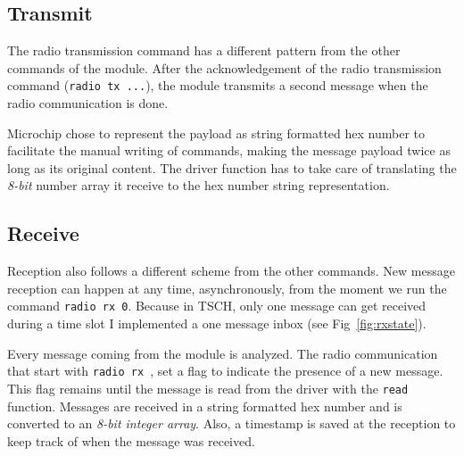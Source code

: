 %



\subsection{Transmit}

The radio transmission command has a different pattern from the other commands
of the module.
After the acknowledgement of the radio transmission command (\lstinline{radio tx ...}),
the module transmits a second message when the radio communication is done.



Microchip chose to represent the payload as string formatted hex number to
facilitate the manual writing of commands, making the message payload twice as
long as its original content.
The driver function has to take care of translating the \emph{8-bit} number
array it receive to the hex number string representation.

\subsection{Receive}

Reception also follows a different scheme from the other commands.
New message reception can happen at any time, asynchronously, from the moment
we run the command \lstinline{radio rx 0}.
Because in TSCH, only one message can get received during a time slot
I implemented a one message inbox (see Fig~\ref{fig:rxstate}).

Every message coming from the module is analyzed.
The radio communication that start with \lstinline{radio rx }, set a flag to
indicate the presence of a new message.
This flag remains until the message is read from the driver with the
\lstinline{read} function.
Messages are received in a string formatted hex number and is converted to an
\emph{8-bit integer array}.
Also, a timestamp is saved at the reception to keep track of when the
message was received.

